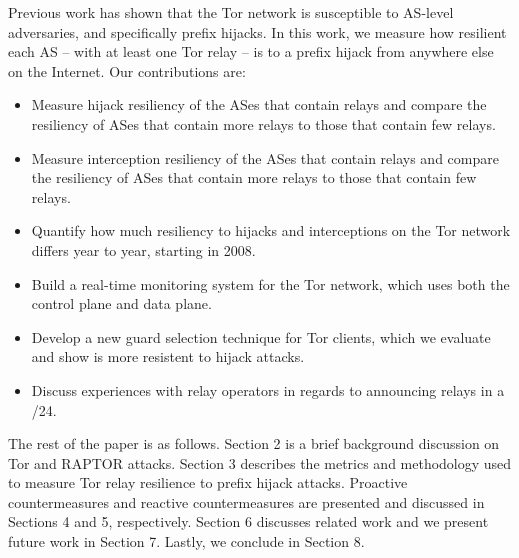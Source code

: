 Previous work has shown that the Tor network is susceptible to AS-level adversaries, and specifically prefix hijacks.  In this work, we measure how resilient each AS -- with at least one Tor relay -- is to a prefix hijack from anywhere else on the Internet.  Our contributions are:

\begin{itemize}
\item Measure hijack resiliency of the ASes that contain relays and compare the resiliency of ASes that contain more relays to those that contain few relays.
\item Measure interception resiliency of the ASes that contain relays and compare the resiliency of ASes that contain more relays to those that contain few relays.
\item Quantify how much resiliency to hijacks and interceptions on the Tor network differs year to year, starting in 2008.
\item Build a real-time monitoring system for the Tor network, which uses both the control plane and data plane.
\item Develop a new guard selection technique for Tor clients, which we evaluate and show is more resistent to hijack attacks.
\item Discuss experiences with relay operators in regards to announcing relays in a /24.
\end{itemize}

The rest of the paper is as follows.  Section 2 is a brief background discussion on Tor and RAPTOR attacks.  Section 3 describes the metrics and methodology used to measure Tor relay resilience to prefix hijack attacks.  Proactive countermeasures and reactive countermeasures are presented and discussed in Sections 4 and 5, respectively.  Section 6 discusses related work and we present future work in Section 7.  Lastly, we conclude in Section 8.

